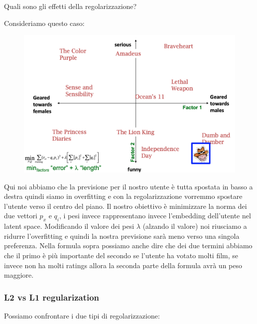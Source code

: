 \documentclass[14pt]{extreport}
\begin{document}
Quali sono gli effetti della regolarizzazione?

Consideriamo questo caso:

\begin{figure}[H]
	\centering
	\includegraphics[width=0.7\linewidth]{526.jpeg}
\end{figure}

Qui noi abbiamo che la previsione per il nostro utente è tutta spostata in basso a destra quindi siamo in overfitting e con la regolarizzazione
vorremmo spostare l'utente verso il centro del piano. Il nostro obiettivo è minimizzare la norma dei due vettori $p_x$ e $q_i$, i pesi invece
rappresentano invece l'embedding dell'utente nel latent space. Modificando il valore dei pesi $\lambda$ (alzando il valore) noi riusciamo a ridurre
l'overfitting e quindi la nostra previsione sarà meno verso una singola preferenza. Nella formula sopra possiamo anche dire che dei due termini
abbiamo che il primo è più importante del secondo se l'utente ha votato molti film, se invece non ha molti ratings allora la seconda parte della
formula avrà un peso maggiore.

\subsubsection{L2 vs L1 regularization}

Possiamo confrontare i due tipi di regolarizzazione:
\end{document}
